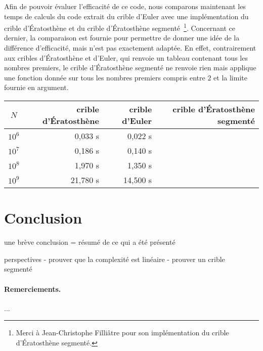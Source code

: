 \documentclass[a4paper]{easychair}
\begin{document}
Afin de pouvoir évaluer l'efficacité de ce code, nous comparons maintenant
les temps de calculs du code extrait du crible d'Euler avec une
implémentation du crible d'Ératosthène et du crible d'Ératosthène
segmenté~\footnote{Merci à
  Jean-Christophe Filliâtre pour son implémentation du crible d'Ératosthène
  segmenté.}.
Concernant ce dernier, la comparaison est fournie pour permettre de donner
une idée de la différence d'efficacité, mais n'est pas exactement adaptée.
En effet, contrairement aux cribles d'Ératosthène et d'Euler, qui renvoie
un tableau contenant tous les nombres premiers, le crible d'Ératosthène
segmenté ne renvoie rien mais applique une fonction donnée sur tous les
nombres premiers compris entre $2$ et la limite fournie en argument.
\begin{center}
  \begin{tabular}{|c|r|r|r|}
    \hline
    $N$ & crible d'Ératosthène & crible d'Euler & crible d'Ératosthène
                                                  segmenté \\
    \hline\hline
    $10^6$ &  0,033 s &  0,022 s &       \\\hline
    $10^7$ &  0,186 s &  0,140 s &       \\\hline
    $10^8$ &  1,970 s &  1,350 s &       \\\hline
    $10^9$ & 21,780 s & 14,500 s &       \\\hline
  \end{tabular}
\end{center}

\section{Conclusion}
\label{sec:conclusion}

une brève conclusion = résumé de ce qui a été présenté

perspectives
- prouver que la complexité est linéaire
- prouver un crible segmenté~\cite{crible-segmente}


\paragraph{Remerciements.} ...



\end{document}
